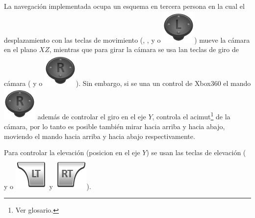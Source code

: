 La navegación implementada ocupa un esquema en tercera persona en la cual el desplazamiento con las teclas de movimiento (, ,  y  o \includegraphics[scale=0.4, trim= 0 20 0 0]{images/visualizer/xbox360/leftStick.png}) mueve la cámara en el plano $XZ$, mientras que para girar la cámara se usa lan teclas de giro de cámara (\keystroke{$\leftarrow$} y \keystroke{$\rightarrow$} o \includegraphics[scale=0.4, trim= 0 20 0 0]{images/visualizer/xbox360/rightStick.png}). Sin embargo, si se una un control de Xbox360\textsuperscript{\textregistered} el mando \includegraphics[scale=0.4, trim= 0 20 0 0]{images/visualizer/xbox360/rightStick.png} además de controlar el giro en el eje $Y$, controla el acimut\footnote{Ver glosario.} de la cámara, por lo tanto es posible también mirar hacia arriba y hacia abajo, moviendo el mando hacia arriba y hacia abajo respectivamente.

Para controlar la elevación (posicion en el eje $Y$) se usan las teclas de elevación (\keystroke{$\uparrow$} y \keystroke{$\downarrow$} o \includegraphics[scale=0.4, trim= 0 20 0 0]{images/visualizer/xbox360/leftShoulder1.png} y \includegraphics[scale=0.4, trim= 0 20 0 0]{images/visualizer/xbox360/rightShoulder1.png}).

